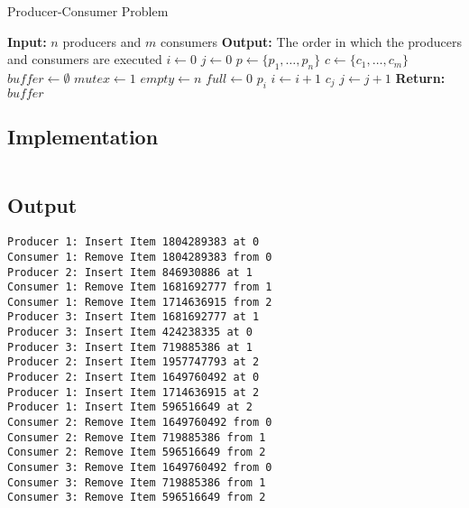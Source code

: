 \begin{algorithm}
    \caption{Producer-Consumer Problem}
    \label{alg:producer_consumer}
    \begin{algorithmic}[1]
        \State \textbf{Input:} $n$ producers and $m$ consumers
        \State \textbf{Output:} The order in which the producers and consumers are executed
        \State $i \gets 0$ 
        \State $j \gets 0$ 
        \State $p \gets \{p_1, \dots, p_n\}$ 
        \State $c \gets \{c_1, \dots, c_m\}$ 
        \State $buffer \gets \emptyset$ 
        \State $mutex \gets 1$ 
        \State $empty \gets n$ 
        \State $full \gets 0$ 
                \State $p_i$ 
                \State $i \gets i + 1$
            \EndIf
                \State $c_j$ 
                \State $j \gets j + 1$
            \EndIf
        \EndWhile
        \State \textbf{Return:} $buffer$
    \end{algorithmic}
\end{algorithm}

\pagebreak
\subsection{Implementation}

\inputminted[fontsize=\footnotesize,autogobble]{c}{code/producer_consumer.c}

\subsection{Output}
\begin{lstlisting}[style=output]
Producer 1: Insert Item 1804289383 at 0
Consumer 1: Remove Item 1804289383 from 0
Producer 2: Insert Item 846930886 at 1
Consumer 1: Remove Item 1681692777 from 1
Consumer 1: Remove Item 1714636915 from 2
Producer 3: Insert Item 1681692777 at 1
Producer 3: Insert Item 424238335 at 0
Producer 3: Insert Item 719885386 at 1
Producer 2: Insert Item 1957747793 at 2
Producer 2: Insert Item 1649760492 at 0
Producer 1: Insert Item 1714636915 at 2
Producer 1: Insert Item 596516649 at 2
Consumer 2: Remove Item 1649760492 from 0
Consumer 2: Remove Item 719885386 from 1
Consumer 2: Remove Item 596516649 from 2
Consumer 3: Remove Item 1649760492 from 0
Consumer 3: Remove Item 719885386 from 1
Consumer 3: Remove Item 596516649 from 2
\end{lstlisting}
